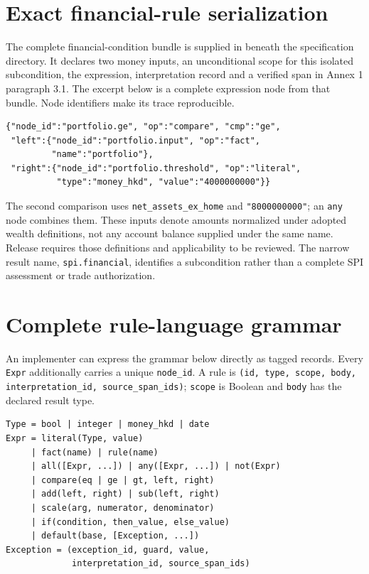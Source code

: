 \documentclass[12pt,a4paper,oneside,openany]{book}
\begin{document}
\section{Exact financial-rule serialization}
\label{sec:financial-serialization}

The complete financial-condition bundle is supplied in
 beneath the specification directory.
It declares two money inputs, an unconditional scope for this isolated
subcondition, the expression, interpretation record and a verified span in
Annex 1 paragraph 3.1. The excerpt below is a complete expression node from
that bundle. Node identifiers make its trace reproducible.

\begin{minipage}{\textwidth}
\begin{lstlisting}[caption={The portfolio comparison in the supplied JSON bundle. Amounts are HK cents.}]
{"node_id":"portfolio.ge", "op":"compare", "cmp":"ge",
 "left":{"node_id":"portfolio.input", "op":"fact",
         "name":"portfolio"},
 "right":{"node_id":"portfolio.threshold", "op":"literal",
          "type":"money_hkd", "value":"4000000000"}}
\end{lstlisting}
\end{minipage}

The second comparison uses \texttt{net\_assets\_ex\_home} and
\texttt{"8000000000"}; an \texttt{any} node combines them. These inputs denote
amounts normalized under adopted wealth definitions, not any account balance
supplied under the same name. Release requires those definitions and applicability
to be reviewed. The narrow result name, \texttt{spi.financial}, identifies a
subcondition rather than a complete SPI assessment or trade authorization.


\section{Complete rule-language grammar}

An implementer can express the grammar below directly as tagged records. Every
\texttt{Expr} additionally carries a unique \texttt{node\_id}. A rule is
\texttt{(id, type, scope, body, interpretation\_id, source\_span\_ids)};
\texttt{scope} is Boolean and \texttt{body} has the declared result type.
\begin{lstlisting}[caption={Complete operator grammar for RuleIR 0.1; repeated arguments are ordered. The Java demonstration implements a stated subset.}]
Type = bool | integer | money_hkd | date
Expr = literal(Type, value)
     | fact(name) | rule(name)
     | all([Expr, ...]) | any([Expr, ...]) | not(Expr)
     | compare(eq | ge | gt, left, right)
     | add(left, right) | sub(left, right)
     | scale(arg, numerator, denominator)
     | if(condition, then_value, else_value)
     | default(base, [Exception, ...])
Exception = (exception_id, guard, value,
             interpretation_id, source_span_ids)
\end{lstlisting}
\end{document}
